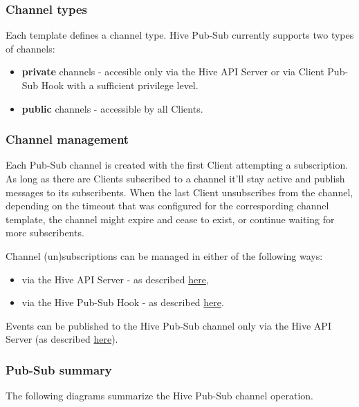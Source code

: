 \documentclass[a4paper]{article}
\begin{document}
\subsubsection{Channel types}
\label{sec-7-3-2}

Each template defines a channel type. Hive Pub-Sub currently supports two types of channels:


\begin{itemize}
\item \textbf{private} channels - accesible only via the Hive API Server or via Client Pub-Sub Hook with a sufficient privilege level.
\item \textbf{public} channels - accessible by all Clients.
\end{itemize}
\subsubsection{Channel management}
\label{sec-7-3-3}

Each Pub-Sub channel is created with the first Client attempting a subscription. As long as there are Clients subscribed to a channel it'll stay active and publish messages to its subscribents. When the last Client unsubscribes from the channel, depending on the timeout that was configured for the correspording channel template, the channel might expire and cease to exist, or continue waiting for more subscribents.

\noindent
Channel (un)subscriptions can be managed in either of the following ways:


\begin{itemize}
\item via the Hive API Server - as described \hyperref[sec-6-1-6]{here},
\item via the Hive Pub-Sub Hook - as described \hyperref[sec-9-2-4]{here}.
\end{itemize}

\noindent
Events can be published to the Hive Pub-Sub channel only via the Hive API Server (as described \hyperref[sec-6-1-6]{here}).
\subsubsection{Pub-Sub summary}
\label{sec-7-3-4}

The following diagrams summarize the Hive Pub-Sub channel operation.
\end{document}
